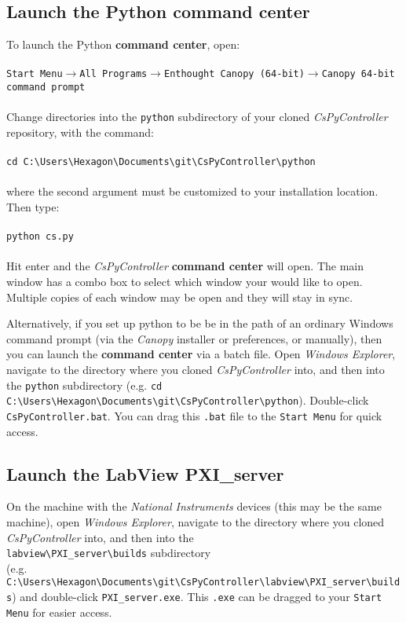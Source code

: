 \documentclass[pdftex,11pt,letterpaper]{article}
\begin{document}
\subsection{Launch the Python \textbf{command center}}

To launch the Python \textbf{command center}, open:
\\ \\
\texttt{Start Menu}$\rightarrow$\texttt{All Programs}$\rightarrow$\texttt{Enthought Canopy (64-bit)}$\rightarrow$\texttt{Canopy 64-bit command prompt}
\\ \\
Change directories into the \texttt{python} subdirectory of your cloned \textit{CsPyController} repository, with the command:
\\ \\
\texttt{cd C:\textbackslash Users\textbackslash Hexagon\textbackslash Documents\textbackslash git\textbackslash CsPyController\textbackslash python}
\\ \\
where the second argument must be customized to your installation location.  Then type:
\\ \\
\texttt{python cs.py}
\\ \\
Hit enter and the \textit{CsPyController} \textbf{command center} will open.  The main window has a combo box to select which window your would like to open.  Multiple copies of each window may be open and they will stay in sync.

Alternatively, if you set up python to be be in the path of an ordinary Windows command prompt (via the \textit{Canopy} installer or preferences, or manually), then you can launch the \textbf{command center} via a batch file.  Open \textit{Windows Explorer}, navigate to the directory where you cloned \textit{CsPyController} into, and then into the \texttt{python} subdirectory (e.g. \texttt{cd C:\textbackslash Users\textbackslash Hexagon\textbackslash Documents\textbackslash git\textbackslash CsPyController\textbackslash python}).  Double-click \texttt{CsPyController.bat}.  You can drag this \texttt{.bat} file to the \texttt{Start Menu} for quick access.

\subsection{Launch the LabView \textbf{PXI\_server}}

On the machine with the \textit{National Instruments} devices (this may be the same machine), open \textit{Windows Explorer}, navigate to the directory where you cloned \textit{CsPyController} into, and then into the\\ \texttt{labview\textbackslash PXI\_server\textbackslash builds} subdirectory \\(e.g. \texttt{C:\textbackslash Users\textbackslash Hexagon\textbackslash Documents\textbackslash git\textbackslash CsPyController\textbackslash labview\textbackslash PXI\_server\textbackslash builds}) and double-click \texttt{PXI\_server.exe}.  This \texttt{.exe} can be dragged to your \texttt{Start Menu} for easier access.
\end{document}
